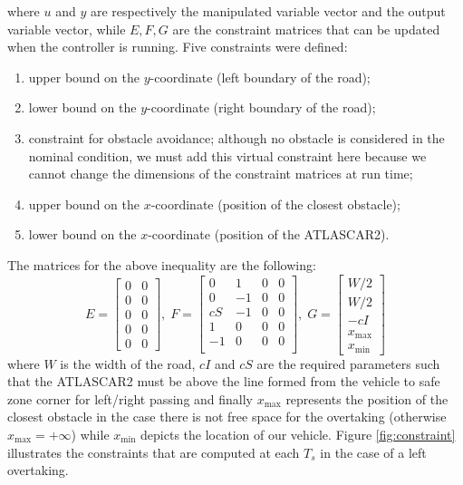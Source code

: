 \documentclass[conference,11pt]{IEEEtran}
\renewcommand{\vec}[1]{\ensuremath{\boldsymbol{\mathit{#1}}}}
\begin{document}
where $\vec{u}$ and $\vec{y}$ are respectively the manipulated variable vector and the output variable vector, while $\vec{E},\vec{F},\vec{G}$ are the constraint matrices that can be updated when the controller is running. Five constraints were defined:
\begin{enumerate}
	\item upper bound on the $y$-coordinate (left boundary of the road);
	\item lower bound on the $y$-coordinate (right boundary of the road);
	\item constraint for obstacle avoidance; although no obstacle is considered in the nominal condition, we must add this virtual constraint here because we cannot change the dimensions of the constraint matrices at run time;
	\item upper bound on the $x$-coordinate (position of the closest obstacle);
	\item lower bound on the $x$-coordinate (position of the ATLASCAR2).
\end{enumerate}
The matrices for the above inequality are the following:
\[
\vec{E}= 
\begin{bmatrix}
0&0\\
0&0\\
0&0\\
0&0\\
0&0
\end{bmatrix},
\;
\vec{F}=\begin{bmatrix}
0&1&0&0\\
0&-1&0&0\\
cS&-1&0&0\\
1&0&0&0\\
-1&0&0&0\\
\end{bmatrix},\;
\vec{G}=
\begin{bmatrix}
W/2\\W/2\\-cI\\x_{\max}\\x_{\min}
\end{bmatrix}
\]
where $W$ is the width of the road, $cI$ and $cS$ are the required parameters such that the ATLASCAR2 must be above the line formed from the vehicle to safe zone corner for left/right passing and finally $x_{\max}$ represents the position of the closest obstacle in the case there is not free space for the overtaking (otherwise $x_{\max}=+\infty$) while $x_{\min}$ depicts the location of our vehicle. Figure \ref{fig:constraint} illustrates the constraints that are computed at each $T_s$ in the case of a left overtaking.
\end{document}
